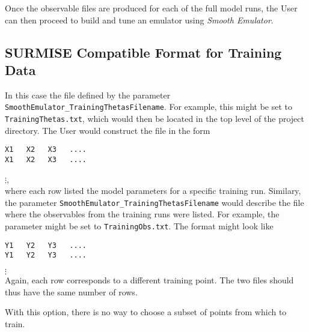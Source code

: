 \documentclass[UserManual.tex]{subfiles}
\begin{document}
Once the observable files are produced for each of the full model runs, the User can then proceed to build and tune an emulator using {\it Smooth Emulator}.

\subsection{SURMISE Compatible Format for Training Data}

In this case the file defined by the parameter {\tt SmoothEmulator\_TrainingThetasFilename}. For example, this might be set to {\tt TrainingThetas.txt}, which would then be located in the top level of the project directory. The User would construct the file in the form
\vspace*{-8pt}
{\tt\begin{verbatim}
X1   X2   X3   ....
X1   X2   X3   ....
\end{verbatim}}
\vspace*{-16pt}
 \hspace*{18pt}$\vdots$,\\
where each row listed the model parameters for a specific training run. Similary, the parameter {\tt SmoothEmulator\_TrainingThetasFilename} would describe the file where the observables from the training runs were listed. For example, the parameter might be set to {\tt TrainingObs.txt}. The format might look like 
\vspace*{-8pt}
{\tt\begin{verbatim}
Y1   Y2   Y3   ....
Y1   Y2   Y3   ....
\end{verbatim}}
\vspace*{-16pt}
 \hspace*{28pt}$\vdots$\\
Again, each row corresponds to a different training point. The two files should thus have the same number of rows.

With this option, there is no way to choose a subset of points from which to train. 
\end{document}
